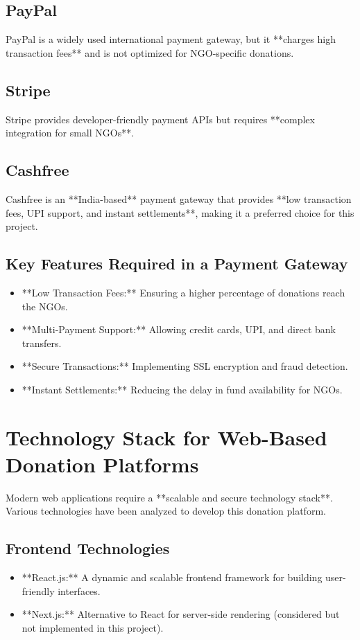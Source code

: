 \subsection{PayPal}
PayPal is a widely used international payment gateway, but it **charges high transaction fees** and is not optimized for NGO-specific donations.

\subsection{Stripe}
Stripe provides developer-friendly payment APIs but requires **complex integration for small NGOs**.

\subsection{Cashfree}
Cashfree is an **India-based** payment gateway that provides **low transaction fees, UPI support, and instant settlements**, making it a preferred choice for this project.

\subsection{Key Features Required in a Payment Gateway}
\begin{itemize}
    \item **Low Transaction Fees:** Ensuring a higher percentage of donations reach the NGOs.
    \item **Multi-Payment Support:** Allowing credit cards, UPI, and direct bank transfers.
    \item **Secure Transactions:** Implementing SSL encryption and fraud detection.
    \item **Instant Settlements:** Reducing the delay in fund availability for NGOs.
\end{itemize}

\section{Technology Stack for Web-Based Donation Platforms}
Modern web applications require a **scalable and secure technology stack**. Various technologies have been analyzed to develop this donation platform.

\subsection{Frontend Technologies}
\begin{itemize}
    \item **React.js:** A dynamic and scalable frontend framework for building user-friendly interfaces.
    \item **Next.js:** Alternative to React for server-side rendering (considered but not implemented in this project).
\end{itemize}

